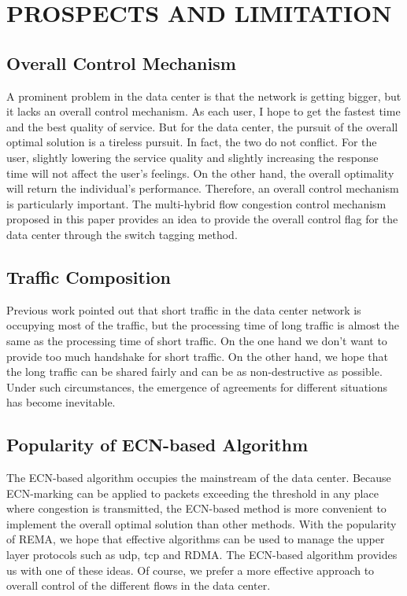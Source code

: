 \documentclass[conference]{IEEEtran}
\begin{document}
\section{PROSPECTS AND LIMITATION}
\subsection{Overall Control Mechanism} A prominent problem in the data center is that the network is getting bigger, but it lacks an overall control mechanism. As each user, I hope to get the fastest time and the best quality of service. But for the data center, the pursuit of the overall optimal solution is a tireless pursuit. In fact, the two do not conflict. For the user, slightly lowering the service quality and slightly increasing the response time will not affect the user's feelings. On the other hand, the overall optimality will return the individual's performance. Therefore, an overall control mechanism is particularly important. The multi-hybrid flow congestion control mechanism proposed in this paper provides an idea to provide the overall control flag for the data center through the switch tagging method.
\subsection{Traffic Composition} Previous work pointed out that short traffic in the data center network is occupying most of the traffic, but the processing time of long traffic is almost the same as the processing time of short traffic. On the one hand we don't want to provide too much handshake for short traffic. On the other hand, we hope that the long traffic can be shared fairly and can be as non-destructive as possible. Under such circumstances, the emergence of agreements for different situations has become inevitable.
\subsection{Popularity of ECN-based Algorithm} The ECN-based algorithm occupies the mainstream of the data center. Because ECN-marking can be applied to packets exceeding the threshold in any place where congestion is transmitted, the ECN-based method is more convenient to implement the overall optimal solution than other methods. With the popularity of REMA, we hope that effective algorithms can be used to manage the upper layer protocols such as udp, tcp and RDMA. The ECN-based algorithm provides us with one of these ideas. Of course, we prefer a more effective approach to overall control of the different flows in the data center.
\end{document}
